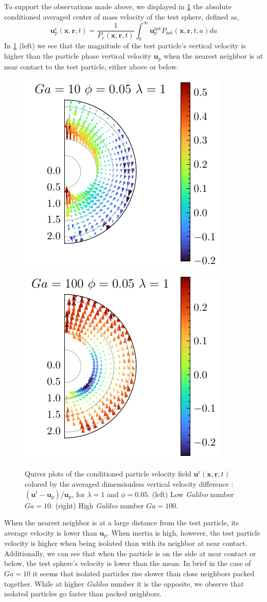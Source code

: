 To support the observations made above, we displayed in \ref{fig:unst_ga} the absolute conditioned averaged center of mass velocity of the test sphere, defined as,
\begin{equation*}
    \textbf{u}^\text{r}_p(\textbf{x},\textbf{r},t)  
    =
    \frac{1}{P_r(\textbf{x},\textbf{r},t)}
    \int_0^\infty \textbf{u}^\text{nst}_pP_\text{nst}(\textbf{x},\textbf{r},t,a) da
\end{equation*}
In \ref{fig:unst_ga} (left) we see that the magnitude of the test particle's vertical velocity is higher than the particle phase vertical velocity $\textbf{u}_p$ when the nearest neighbor is at near contact to the test particle, either above or below.
\begin{figure}[h!]
    \centering
    \includegraphics[height=0.35\textwidth]{image/HOMOGENEOUS_NEW/Dist/U_l_1_Ga_10_PHI_5.pdf}
    \includegraphics[height=0.35\textwidth]{image/HOMOGENEOUS_NEW/Dist/U_l_1_Ga_100_PHI_5.pdf}
    \caption{
         Quiver plots of the conditioned particle velocity field $\textbf{u}^\text{r}(\textbf{x},\textbf{r},t)$ colored by the averaged dimensionless vertical velocity difference : $(\textbf{u}^\text{r} - \textbf{u}_p )/ \textbf{u}_p$, for $\lambda = 1$ and $\phi = 0.05$. 
         (left) Low \textit{Galileo} number $Ga = 10$.
        (right) High \textit{Galileo} number $Ga = 100$.
         }
    \label{fig:unst_ga}
\end{figure}
When the nearest neighbor is at a large distance from the test particle, its average velocity is lower than $\textbf{u}_p$. 
When inertia is high, however, the test particle velocity is higher when being isolated than with its neighbor at near contact. 
Additionally, we can see that when the particle is on the side at near contact or below, the test sphere's velocity  is lower than the mean. 
In brief in the case of $Ga = 10$ it seems that isolated particles rise slower than close neighbors packed together. 
While at higher \textit{Galileo} number it is the opposite, we observe that isolated particles go faster than packed neighbors. 


